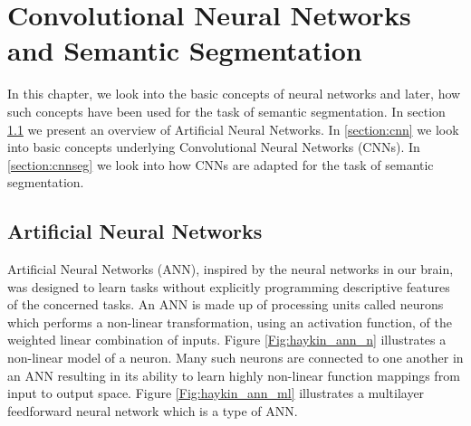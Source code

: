 
\chapter{Convolutional Neural Networks and Semantic Segmentation}

	In this chapter, we look into the basic concepts of neural networks and later, how such concepts have been used for the task of semantic segmentation. In section \ref{section:ann} we present an overview of Artificial Neural Networks. In \ref{section:cnn} we look into basic concepts underlying Convolutional Neural Networks (CNNs). In \ref{section:cnnseg} we look into how CNNs are adapted for the task of semantic segmentation.

\section{Artificial Neural Networks}
\label{section:ann}

Artificial Neural Networks (ANN), inspired by the neural networks in our brain, was designed to learn tasks without explicitly programming descriptive features of the concerned tasks. An ANN is made up of processing units called neurons which performs a non-linear transformation, using an activation function, of the weighted linear combination of inputs. Figure \ref{Fig:haykin_ann_n} illustrates a non-linear model of a neuron. Many such neurons are connected to one another in an ANN resulting in its ability to learn highly non-linear function mappings from input to output space. Figure \ref{Fig:haykin_ann_ml} illustrates a multilayer feedforward neural network which is a type of ANN.

